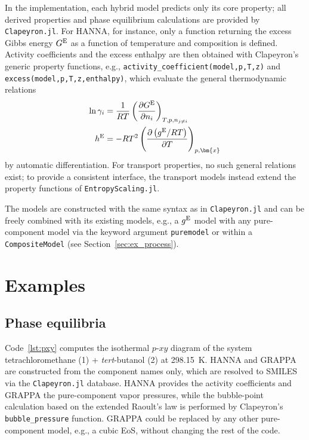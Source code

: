 \documentclass{juliacon}
\begin{document}
In the implementation, each hybrid model predicts only its core property; all derived properties and phase equilibrium calculations are provided by \texttt{Clapeyron.jl}.
For HANNA, for instance, only a function returning the excess Gibbs energy $G^{\rm E}$ as a function of temperature and composition is defined.
Activity coefficients and the excess enthalpy are then obtained with Clapeyron's generic property functions, e.g., \texttt{activity\_coefficient(model,p,T,z)} and \texttt{excess(model,p,T,z,enthalpy)}, which evaluate the general thermodynamic relations
\begin{align}
\ln \gamma_i &= \frac{1}{RT} \left(\frac{\partial G^{\rm E}}{\partial n_i}\right)_{T,p,n_{j\neq i}} \\
h^{\rm E} &= -RT^2 \left(\frac{\partial \left(g^{\rm E}/RT\right)}{\partial T}\right)_{p,\bm{x}}
\end{align}
by automatic differentiation.
For transport properties, no such general relations exist; to provide a consistent interface, the transport models instead extend the property functions of \texttt{EntropyScaling.jl}.

The models are constructed with the same syntax as in \texttt{Clapeyron.jl} and can be freely combined with its existing models, e.g., a $g^{\rm E}$ model with any pure-component model via the keyword argument \texttt{puremodel} or within a \texttt{CompositeModel} (see Section~\ref{sec:ex_process}).

\section{Examples} \label{sec:examples}
\subsection{Phase equilibria} \label{sec:ex_mix}

Code~\ref{lst:pxy} computes the isothermal $p$-$xy$ diagram of the system tetrachloromethane (1) + \textit{tert}-butanol (2) at 298.15~K.
HANNA and GRAPPA are constructed from the component names only, which are resolved to SMILES via the \texttt{Clapeyron.jl} database.
HANNA provides the activity coefficients and GRAPPA the pure-component vapor pressures, while the bubble-point calculation based on the extended Raoult's law is performed by Clapeyron's \texttt{bubble\_pressure} function.
GRAPPA could be replaced by any other pure-component model, e.g., a cubic EoS, without changing the rest of the code.
\end{document}
